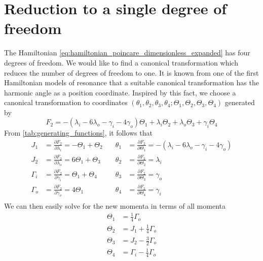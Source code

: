 \section{Reduction to a single degree of freedom}
\label{sec:Reduction_to_a_sdof}
The Hamiltonian \ref{eq:hamiltonian_poincare_dimensionless_expanded} has four
degrees of freedom. We would like to find a canonical transformation which
reduces the number of degrees of freedom to one. It is known from one of the 
first Hamiltonian models of resonance \citep{Henrard1983} that a suitable 
canonical transformation has the harmonic angle as a position coordinate.
Inspired by this fact, we choose a canonical transformation  to coordinates
$(\theta_1,\theta_2,\theta_3,\theta_4;\Theta_1,\Theta_2,\Theta_3,\Theta_4)$ 
generated by
\begin{equation}
    F_2= -(\lambda_i-6\lambda_o -\gamma_i - 4\gamma_o)\Theta_1 + 
    \lambda_i\Theta_2+ \lambda_o\Theta_3+\gamma_i\Theta_4
\end{equation}
From \cref{tab:generating_functions}, it follows that 
\begin{equation}
    \begin{aligned}
        J_1&= \frac{\partial F_2}{\partial \lambda_i}=-\Theta_1+\Theta_2 & 
        \quad\theta_1&= \frac{\partial F_2}{\partial\Theta_1}=
        - (\lambda_i-6\lambda_o -\gamma_i - 4\gamma_o)\\
J_2&= \frac{\partial F_2}{\partial \lambda_o}=6\Theta_1+\Theta_3 & 
        \quad\theta_2&= \frac{\partial F_2}{\partial\Theta_2}=\lambda_i\\
\Gamma_i&= \frac{\partial F_2}{\partial \gamma_i}=\Theta_1+\Theta_4& 
        \quad\theta_3&= \frac{\partial F_2}{\partial\Theta_3}=\gamma_o\\
\Gamma_o&= \frac{\partial F_2}{\partial \gamma_o}=4\Theta_1& 
        \quad\theta_4&= \frac{\partial F_2}{\partial\Theta_4}=\gamma_i\\
    \end{aligned}
    \label{eq:new_momenta}
\end{equation}
We can then easily solve for the new momenta in terms of all momenta
\begin{equation}
    \begin{align}
        \Theta_1&= \frac{1}{4} \Gamma_o\\
        \Theta_2&=J_1+ \frac{1}{4} \Gamma_o\\
        \Theta_3&=J_2 - \frac{3}{2} \Gamma_o\\
        \Theta_4&= \Gamma_i - \frac{1}{4} \Gamma_o
    \end{align}
\end{equation}
